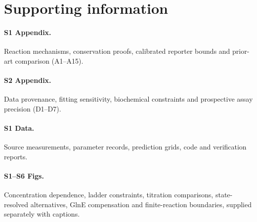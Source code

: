 \documentclass[10pt,letterpaper]{article}
\begin{document}
\section*{Supporting information}

\paragraph{S1 Appendix.} Reaction mechanisms, conservation proofs, calibrated reporter bounds and prior-art comparison (A1--A15).
\paragraph{S2 Appendix.} Data provenance, fitting sensitivity, biochemical constraints and prospective assay precision (D1--D7).
\paragraph{S1 Data.} Source measurements, parameter records, prediction grids, code and verification reports.
\paragraph{S1--S6 Figs.} Concentration dependence, ladder constraints, titration comparisons, state-resolved alternatives, GlnE compensation and finite-reaction boundaries, supplied separately with captions.
\end{document}
